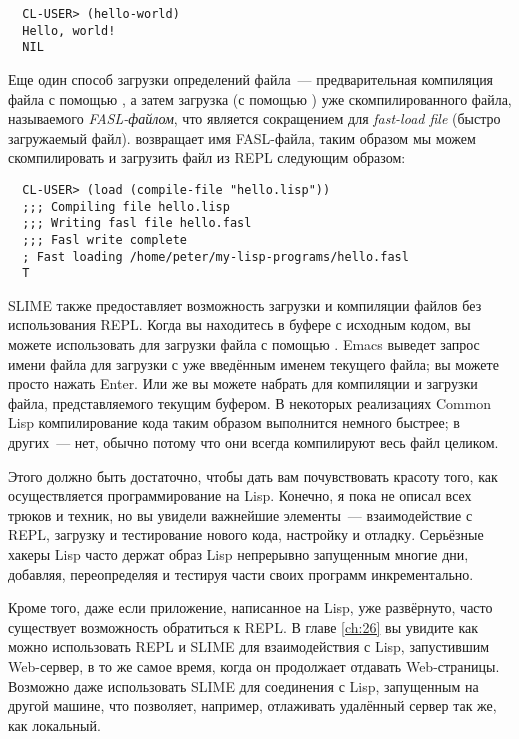 \begin{verbatim}
  CL-USER> (hello-world)
  Hello, world!
  NIL
\end{verbatim}

Еще один способ загрузки определений файла~--- предварительная компиляция файла с помощью
, а затем загрузка (с помощью ) уже скомпилированного файла, называемого
\emph{FASL-файлом}, что является сокращением для \emph{fast-load file} (быстро загружаемый
файл).  возвращает имя FASL-файла, таким образом мы можем скомпилировать и
загрузить файл из REPL следующим образом:

\begin{verbatim}
  CL-USER> (load (compile-file "hello.lisp"))
  ;;; Compiling file hello.lisp
  ;;; Writing fasl file hello.fasl
  ;;; Fasl write complete
  ; Fast loading /home/peter/my-lisp-programs/hello.fasl
  T
\end{verbatim}

SLIME также предоставляет возможность загрузки и компиляции файлов без использования
REPL. Когда вы находитесь в буфере с исходным кодом, вы можете использовать  для
загрузки файла с помощью . Emacs выведет запрос имени файла для загрузки с
уже введённым именем текущего файла; вы можете просто нажать Enter. Или же вы можете
набрать  для компиляции и загрузки файла, представляемого текущим буфером. В
некоторых реализациях Common Lisp компилирование кода таким образом выполнится немного
быстрее; в других~--- нет, обычно потому что они всегда компилируют весь файл целиком.

Этого должно быть достаточно, чтобы дать вам почувствовать красоту того, как
осуществляется программирование на Lisp. Конечно, я пока не описал всех трюков и техник,
но вы увидели важнейшие элементы~--- взаимодействие с REPL, загрузку и тестирование нового
кода, настройку и отладку. Серьёзные хакеры Lisp часто держат образ Lisp непрерывно
запущенным многие дни, добавляя, переопределяя и тестируя части своих программ
инкрементально.

Кроме того, даже если приложение, написанное на Lisp, уже развёрнуто, часто существует
возможность обратиться к REPL. В главе \ref{ch:26} вы увидите как можно использовать REPL и SLIME
для взаимодействия с Lisp, запустившим Web-сервер, в то же самое время, когда он
продолжает отдавать Web-страницы. Возможно даже использовать SLIME для соединения с Lisp,
запущенным на другой машине, что позволяет, например, отлаживать удалённый сервер так же,
как локальный.

